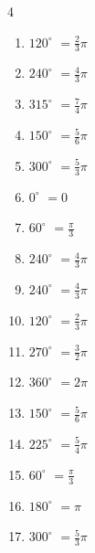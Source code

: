 \begin{multicols}{4}
\begin{enumerate}
  \item $\displaystyle 120^{\circ}$
        $\displaystyle =\frac{2}{3}\pi$

  \item $\displaystyle 240^{\circ}$
        $\displaystyle =\frac{4}{3}\pi$

  \item $\displaystyle 315^{\circ}$
        $\displaystyle =\frac{7}{4}\pi$

  \item $\displaystyle 150^{\circ}$
        $\displaystyle =\frac{5}{6}\pi$

  \item $\displaystyle 300^{\circ}$
        $\displaystyle =\frac{5}{3}\pi$

  \item $\displaystyle 0^{\circ}$
        $\displaystyle =0$

  \item $\displaystyle 60^{\circ}$
        $\displaystyle =\frac{\pi}{3}$

  \item $\displaystyle 240^{\circ}$
        $\displaystyle =\frac{4}{3}\pi$

  \item $\displaystyle 240^{\circ}$
        $\displaystyle =\frac{4}{3}\pi$

  \item $\displaystyle 120^{\circ}$
        $\displaystyle =\frac{2}{3}\pi$

  \item $\displaystyle 270^{\circ}$
        $\displaystyle =\frac{3}{2}\pi$

  \item $\displaystyle 360^{\circ}$
        $\displaystyle =2\pi$

  \item $\displaystyle 150^{\circ}$
        $\displaystyle =\frac{5}{6}\pi$

  \item $\displaystyle 225^{\circ}$
        $\displaystyle =\frac{5}{4}\pi$

  \item $\displaystyle 60^{\circ}$
        $\displaystyle =\frac{\pi}{3}$

  \item $\displaystyle 180^{\circ}$
        $\displaystyle =\pi$

  \item $\displaystyle 300^{\circ}$
        $\displaystyle =\frac{5}{3}\pi$


\end{enumerate}
\end{multicols}
